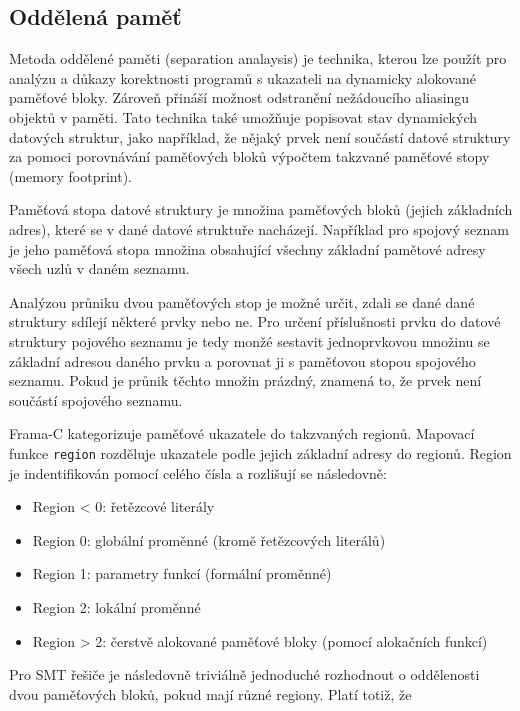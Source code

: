 \subsection{Oddělená paměť}
\label{subsec:oddelena-pamet}

Metoda oddělené paměti (separation analaysis) je technika,
kterou lze použít pro analýzu a důkazy korektnosti programů
s ukazateli na dynamicky alokované paměťové bloky.
Zároveň přináší možnost odstranění nežádoucího aliasingu
objektů v paměti.
Tato technika také umožňuje popisovat stav dynamických datových struktur,
jako například, že nějaký prvek není součástí datové struktury
za pomoci porovnávání paměťových bloků výpočtem takzvané paměťové stopy (memory footprint).

Paměťová stopa datové struktury je množina paměťových bloků (jejich základních adres),
které se v dané datové struktuře nacházejí.
Například pro spojový seznam je jeho paměťová stopa množina
obsahující všechny základní pamětové adresy všech uzlů v daném seznamu.

Analýzou průniku dvou paměťových stop je možné určit,
zdali se dané dané struktury sdílejí některé prvky nebo ne.
Pro určení příslušnosti prvku do datové struktury pojového seznamu
je tedy monžé sestavit jednoprvkovou množinu se základní adresou daného prvku
a porovnat ji s paměťovou stopou spojového seznamu.
Pokud je průnik těchto množin prázdný,
znamená to, že prvek není součástí spojového seznamu.

Frama\mbox{-}C kategorizuje paměťové ukazatele do takzvaných regionů.
Mapovací funkce \texttt{region} rozděluje ukazatele podle jejich základní adresy do regionů.
Region je indentifikován pomocí celého čísla a rozlišují se následovně:

\begin{itemize}
    \item Region < 0: řetězcové literály
    \item Region 0: globální proměnné (kromě řetězcových literálů)
    \item Region 1: parametry funkcí (formální proměnné)
    \item Region 2: lokální proměnné
    \item Region > 2: čerstvě alokované paměťové bloky (pomocí alokačních funkcí)
\end{itemize}

Pro SMT řešiče je následovně triviálně jednoduché rozhodnout o oddělenosti dvou paměťových bloků,
pokud mají různé regiony.
Platí totiž, že

